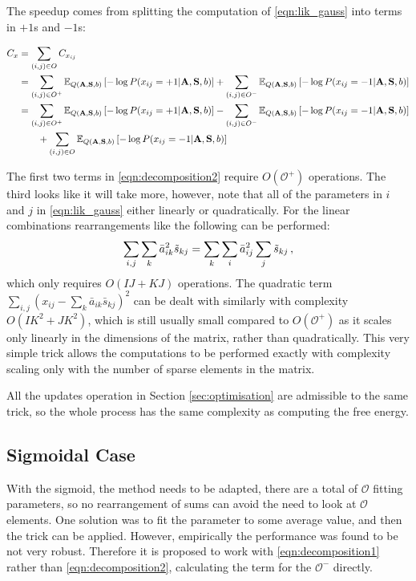 \documentclass{article}
\newcommand{\obs}{O}
\newcommand{\A}{\mathbf{A}}
\newcommand{\s}{\mathbf{S}}
\newcommand{\abar}{\bar{a}}
\newcommand{\stil}{\tilde{s}}
\newcommand{\sbar}{\bar{s}}
\newcommand{\E}{\mathbb{E}}
\begin{document}
The speedup comes from splitting the computation of \eqref{eqn:lik_gauss} into terms in $+1$s and $-1$s:

\begin{align}
C_x &= \sum_{(i,j)\in\obs}C_{x_{ij}} \notag\\
&= \sum_{(i,j)\in\obs^+}\E_{Q(\A,\s,b)}\left[ -\log P(x_{ij}=+1|\A,\s,b) \right] + 
\sum_{(i,j)\in\obs^-}\E_{Q(\A,\s,b)}\left[ -\log P(x_{ij}=-1|\A,\s,b) \right] \label{eqn:decomposition1}\\
&= \sum_{(i,j)\in\obs^+}\E_{Q(\A,\s,b)}\left[ -\log P(x_{ij}=+1|\A,\s,b) \right]
-\sum_{(i,j)\in\obs^-}\E_{Q(\A,\s,b)}\left[ -\log P(x_{ij}=-1|\A,\s,b) \right]
\notag\\
&\qquad+\sum_{(i,j)\in\obs}\E_{Q(\A,\s,b)}\left[ -\log P(x_{ij}=-1|\A,\s,b) \right]
\label{eqn:decomposition2}\\
\end{align}

The first two terms in \eqref{eqn:decomposition2} require $O(\mathcal{O}^+)$ operations.
The third looks like it will take more, however, note that all of the parameters in
$i$ and $j$ in \eqref{eqn:lik_gauss} either linearly or quadratically. For the linear combinations 
rearrangements like the following can be performed:
\begin{equation}
\sum_{i,j}\sum_k \abar_{ik}^2\stil_{kj} = \sum_k \sum_i \abar_{ij}^2 \sum_j \stil_{kj}\,, \notag
\end{equation}
which only requires $O(IJ+KJ)$ operations. The quadratic term $\sum_{i,j}(x_{ij} - \sum_k \abar_{ik}\sbar_{kj})^2$ can be dealt with similarly with complexity $O(IK^2+JK^2)$, which is still usually 
small compared to $O(\mathcal{O}^+)$ as it scales only linearly in the dimensions of the matrix, rather than quadratically. This very simple trick allows the computations to be performed exactly with complexity scaling only with the number of sparse elements in the matrix.

All the updates operation in Section \ref{sec:optimisation} are admissible to the same trick, so the whole process has the same complexity as computing the free energy.

\subsection{Sigmoidal Case}
With the sigmoid, the method needs to be adapted, there are a total of $\mathcal{O}$ fitting 
parameters, so no rearrangement of sums can avoid the need to look at $\mathcal{O}$ elements.
One solution was to fit the parameter to some average value, and then the trick can be applied.
However, empirically the performance was found to be not very robust.
Therefore it is proposed to work with \eqref{eqn:decomposition1} rather than \eqref{eqn:decomposition2},
calculating the term for the $\mathcal{O}^-$ directly.
\end{document}
